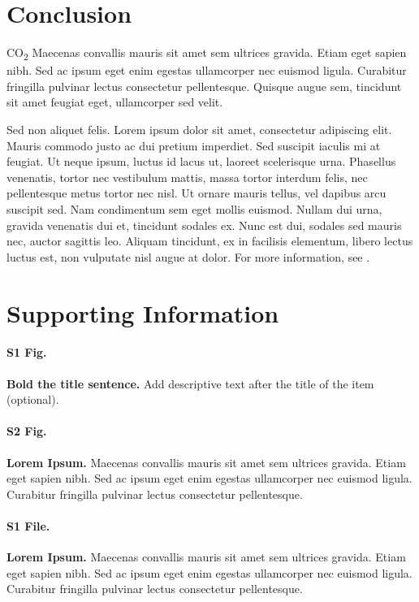 \documentclass[10pt,letterpaper]{article}
\begin{document}
\section*{Conclusion}

CO\textsubscript{2} Maecenas convallis mauris sit amet sem ultrices gravida. Etiam eget sapien nibh. Sed ac ipsum eget enim egestas ullamcorper nec euismod ligula. Curabitur fringilla pulvinar lectus consectetur pellentesque. Quisque augue sem, tincidunt sit amet feugiat eget, ullamcorper sed velit. 

Sed non aliquet felis. Lorem ipsum dolor sit amet, consectetur adipiscing elit. Mauris commodo justo ac dui pretium imperdiet. Sed suscipit iaculis mi at feugiat. Ut neque ipsum, luctus id lacus ut, laoreet scelerisque urna. Phasellus venenatis, tortor nec vestibulum mattis, massa tortor interdum felis, nec pellentesque metus tortor nec nisl. Ut ornare mauris tellus, vel dapibus arcu suscipit sed. Nam condimentum sem eget mollis euismod. Nullam dui urna, gravida venenatis dui et, tincidunt sodales ex. Nunc est dui, sodales sed mauris nec, auctor sagittis leo. Aliquam tincidunt, ex in facilisis elementum, libero lectus luctus est, non vulputate nisl augue at dolor. For more information, see .

\section*{Supporting Information}

\paragraph*{S1 Fig.}
\label{S1_Fig}
{\bf Bold the title sentence.} Add descriptive text after the title of the item (optional).

\paragraph*{S2 Fig.}
\label{S2_Fig}
{\bf Lorem Ipsum.} Maecenas convallis mauris sit amet sem ultrices gravida. Etiam eget sapien nibh. Sed ac ipsum eget enim egestas ullamcorper nec euismod ligula. Curabitur fringilla pulvinar lectus consectetur pellentesque.

\paragraph*{S1 File.}
\label{S1_File}
{\bf Lorem Ipsum.}  Maecenas convallis mauris sit amet sem ultrices gravida. Etiam eget sapien nibh. Sed ac ipsum eget enim egestas ullamcorper nec euismod ligula. Curabitur fringilla pulvinar lectus consectetur pellentesque.
\end{document}
